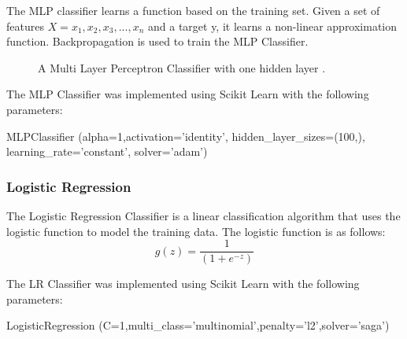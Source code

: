 The MLP classifier learns a function based on the training set. Given a set of features $X = x_1,x_2,x_3,...,x_n$ and a target y, it learns a non-linear approximation function. Backpropagation is used to train the MLP Classifier.

\begin{figure}[h!]
\centering
{}
\caption{\label{fig:mlp} A Multi Layer Perceptron Classifier with one hidden layer \cite{scikit-learn}.}
\end{figure}

The MLP Classifier was implemented using Scikit Learn with the following parameters:

\begin{tcolorbox}
\begin{center}
	MLPClassifier (alpha=1,activation='identity', hidden\_layer\_sizes=(100,), learning\_rate='constant', solver='adam')
\end{center}
\end{tcolorbox}

\subsubsection*{Logistic Regression}

The Logistic Regression Classifier is a linear classification algorithm that uses the logistic function to model the training data. The logistic function is as follows:
\begin{equation}
  g(z)= \frac{1}{(1+e^{-z})}  
\end{equation}

The LR Classifier was implemented using Scikit Learn with the following parameters:

\begin{tcolorbox}
\begin{center}
	LogisticRegression (C=1,multi\_class='multinomial',penalty='l2',solver='saga')
\end{center}
\end{tcolorbox}

